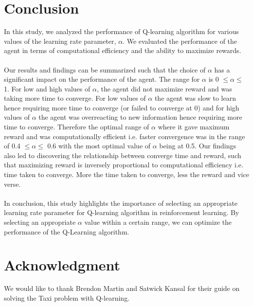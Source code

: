 \documentclass[conference]{IEEEtran}
\begin{document}
\section{Conclusion}
 In this study, we analyzed the performance of Q-learning algorithm for various values of the learning rate parameter, $\alpha$. We evaluated the performance of the agent in terms of computational efficiency and the ability to maximize rewards. \\ \\ Our results and findings can be summarized such that the choice of $\alpha$ has a significant impact on the performance of the agent. The range for $\alpha$ is 0 $\leq \alpha \leq$ 1. For low and high values of $\alpha$, the agent did not maximize reward and was taking more time to converge. For low values of $\alpha$ the agent was slow to learn hence requiring more time to converge (or failed to converge at 0) and for high values of $\alpha$ the agent was overreacting to new information hence requiring more time to converge. Therefore the optimal range of $\alpha$ where it gave maximum reward and was computationally efficient i.e. faster convergence was in the range of 0.4  $\leq \alpha \leq$ 0.6 with the most optimal value of $\alpha$ being at 0.5. Our findings also led to discovering the relationship between converge time and reward, such that maximizing reward is inversely proportional to computational efficiency i.e. time taken to converge. More the time taken to converge, less the reward and vice verse. \\ \\ In conclusion, this study highlights the importance of selecting an appropriate learning rate parameter for Q-learning algorithm in reinforcement learning. By selecting an appropriate $\alpha$ value within a certain range, we can optimize the performance of the Q-Learning algorithm. 

\section*{Acknowledgment}
We would like to thank Brendon Martin and Satwick Kansal for their guide \cite{5} on solving the Taxi problem with Q-learning. 
\end{document}
